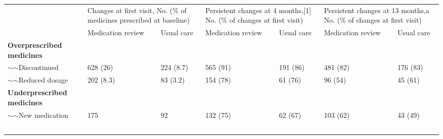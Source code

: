\begin{table}[]
\begin{tabular}{lllllll}
\hline
\multirow{2}{*}{}                  & \multicolumn{2}{l}{Changes at first visit, No. (\%   of medicines prescribed at baseline)} & \multicolumn{2}{l}{Persistent changes at 4   months,{[}1{]} No. (\% of changes at first visit)} & \multicolumn{2}{l}{Persistent changes at 13   months,a No. (\% of   changes at first visit)} \\ \cline{2-7} 
                                   & Medication review                               & Usual care                               & Medication review                                  & Usual care                                 & Medication review                                & Usual care                                \\ \cline{1-1}
\textbf{Overprescribed medicines}  &                                                 &                                          &                                                    &                                            &                                                  &                                           \\
$\sim$$\sim$Discontinued           & 628 (26)                                        & 224 (8.7)                                & 565 (91)                                           & 191 (86)                                   & 481 (82)                                         & 176 (83)                                  \\
$\sim$$\sim$Reduced dosage         & 202 (8.3)                                       & 83 (3.2)                                 & 154 (78)                                           & 61 (76)                                    & 96 (54)                                          & 45 (61)                                   \\
\textbf{Underprescribed medicines} &                                                 &                                          &                                                    &                                            &                                                  &                                           \\
$\sim$$\sim$New medication         & 175                                             & 92                                       & 132 (75)                                           & 62 (67)                                    & 103 (62)                                         & 43 (49)                                   \\
$$
\end{tabular}
\end{table}
